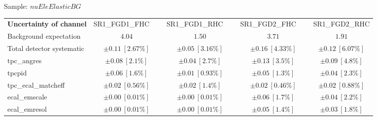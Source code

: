 
\begin{table}
{\large Sample: $nuEleElasticBG$}
\begin{center}
\setlength{\tabcolsep}{0.0pc}
\begin{tabular*}{\textwidth}{@{\extracolsep{\fill}}lcccc}
\noalign{\smallskip}\hline\noalign{\smallskip}
{\bf Uncertainty of channel}                                    & {\small SR1\_FGD1\_FHC}~~~           & {\small SR1\_FGD1\_RHC}~~~            & {\small SR1\_FGD2\_FHC}~~~            & {\small SR1\_FGD2\_RHC}            \\
\noalign{\smallskip}\hline\noalign{\smallskip}
Background expectation             &  $4.04$        &  $1.50$        &  $3.71$        &  $1.91$       \\
Total detector systematic               & $\pm 0.11\ [2.67\%] $        & $\pm 0.05\ [3.16\%] $        & $\pm 0.16\ [4.33\%] $        & $\pm 0.12\ [6.07\%] $             \\
\noalign{\smallskip}\hline\noalign{\smallskip}
\noalign{\smallskip}\hline\noalign{\smallskip}
tpc\_angres         & $\pm 0.08\ [2.1\%] $          & $\pm 0.04\ [2.7\%] $          & $\pm 0.13\ [3.5\%] $          & $\pm 0.09\ [4.8\%] $       \\
tpcpid\         & $\pm 0.06\ [1.6\%] $          & $\pm 0.01\ [0.93\%] $          & $\pm 0.05\ [1.3\%] $          & $\pm 0.04\ [2.3\%] $       \\
tpc\_ecal\_matcheff         & $\pm 0.02\ [0.56\%] $          & $\pm 0.02\ [1.4\%] $          & $\pm 0.02\ [0.46\%] $          & $\pm 0.02\ [0.88\%] $       \\
ecal\_emscale         & $\pm 0.00\ [0.01\%] $          & $\pm 0.00\ [0.01\%] $          & $\pm 0.06\ [1.7\%] $          & $\pm 0.04\ [2.2\%] $       \\
ecal\_emresol         & $\pm 0.00\ [0.01\%] $          & $\pm 0.00\ [0.01\%] $          & $\pm 0.05\ [1.4\%] $          & $\pm 0.03\ [1.8\%] $       \\

\end{tabular*}
\end{center}
\end{table}

